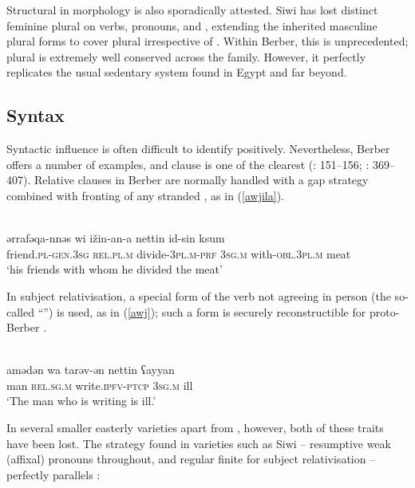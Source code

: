 \documentclass[output=paper]{langsci/langscibook}
\begin{document}
Structural  in morphology is also sporadically attested. Siwi has lost distinct feminine plural  on verbs, pronouns, and , extending the inherited masculine plural forms to cover plural  irrespective of . Within Berber, this is unprecedented; plural   is extremely well conserved across the family. However, it perfectly replicates the usual sedentary  system found in Egypt and far beyond.


 
 \subsection{Syntax}


Syntactic influence is often difficult to identify positively.  Nevertheless, Berber offers a number of examples, and  clause  is one of the clearest (\citealt{Souag2013book}: 151–156; \citealt{Kossmann2013book}: 369–407). Relative clauses in Berber are normally handled with a gap strategy combined with fronting of any stranded , as in ‎(\ref{awjila}).

\ea
{ \citep[79]{Paradisi1961}}\\ \label{awjila}
\gll ərrafəqa-nnəs wi ižin-an-a nettin id-sin ksum\\
     friend\textsc{.pl}{}-\textsc{gen.}\textsc{3sg} \textsc{rel.pl.m} divide-\textsc{3pl.m-prf} 3\textsc{sg.m} with-\textsc{obl.}3\textsc{pl}.\textsc{m} meat\\
\glt `his friends with whom he divided the meat'
\z

In subject relativisation, a special form of the verb not agreeing in person (the so-called “”) is used, as in (\ref{awj}); such a form is securely reconstructible for proto-Berber \citep{Kossmann2003}. 

\ea \label{awj}
{ \citep[162]{Paradisi1960}}\\
\gll amədən wa tarəv-ən nettin ʕayyan\\
     man \textsc{rel.sg.m} write.\textsc{ipfv-ptcp} \textsc{3sg.m} ill\\
\glt `The man who is writing is ill.'
\z

In several smaller easterly varieties apart from , however, both of these traits have been lost. The strategy found in varieties such as Siwi – resumptive weak (affixal) pronouns throughout, and regular finite  for subject relativisation – perfectly parallels : 
\end{document}

